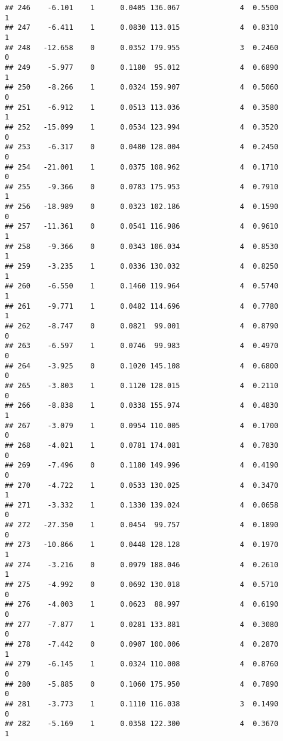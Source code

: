 \documentclass[
]{article}
\begin{document}
\begin{verbatim}
## 246    -6.101    1      0.0405 136.067              4  0.5500      1
## 247    -6.411    1      0.0830 113.015              4  0.8310      1
## 248   -12.658    0      0.0352 179.955              3  0.2460      0
## 249    -5.977    0      0.1180  95.012              4  0.6890      1
## 250    -8.266    1      0.0324 159.907              4  0.5060      0
## 251    -6.912    1      0.0513 113.036              4  0.3580      1
## 252   -15.099    1      0.0534 123.994              4  0.3520      0
## 253    -6.317    0      0.0480 128.004              4  0.2450      0
## 254   -21.001    1      0.0375 108.962              4  0.1710      0
## 255    -9.366    0      0.0783 175.953              4  0.7910      1
## 256   -18.989    0      0.0323 102.186              4  0.1590      0
## 257   -11.361    0      0.0541 116.986              4  0.9610      1
## 258    -9.366    0      0.0343 106.034              4  0.8530      1
## 259    -3.235    1      0.0336 130.032              4  0.8250      1
## 260    -6.550    1      0.1460 119.964              4  0.5740      1
## 261    -9.771    1      0.0482 114.696              4  0.7780      1
## 262    -8.747    0      0.0821  99.001              4  0.8790      0
## 263    -6.597    1      0.0746  99.983              4  0.4970      0
## 264    -3.925    0      0.1020 145.108              4  0.6800      0
## 265    -3.803    1      0.1120 128.015              4  0.2110      0
## 266    -8.838    1      0.0338 155.974              4  0.4830      1
## 267    -3.079    1      0.0954 110.005              4  0.1700      0
## 268    -4.021    1      0.0781 174.081              4  0.7830      0
## 269    -7.496    0      0.1180 149.996              4  0.4190      0
## 270    -4.722    1      0.0533 130.025              4  0.3470      1
## 271    -3.332    1      0.1330 139.024              4  0.0658      0
## 272   -27.350    1      0.0454  99.757              4  0.1890      0
## 273   -10.866    1      0.0448 128.128              4  0.1970      1
## 274    -3.216    0      0.0979 188.046              4  0.2610      1
## 275    -4.992    0      0.0692 130.018              4  0.5710      0
## 276    -4.003    1      0.0623  88.997              4  0.6190      0
## 277    -7.877    1      0.0281 133.881              4  0.3080      0
## 278    -7.442    0      0.0907 100.006              4  0.2870      1
## 279    -6.145    1      0.0324 110.008              4  0.8760      0
## 280    -5.885    0      0.1060 175.950              4  0.7890      0
## 281    -3.773    1      0.1110 116.038              3  0.1490      0
## 282    -5.169    1      0.0358 122.300              4  0.3670      1

\end{verbatim}
\end{document}
